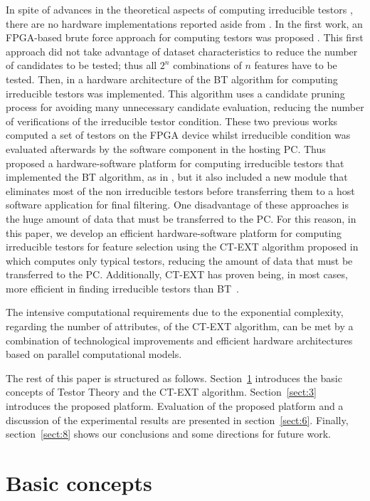 \documentclass[authoryear,preprint,review,12pt]{elsarticle}
\begin{document}
In spite of advances in the theoretical aspects of computing
irreducible testors \citep{R5,R8,R9}, there are 
no hardware implementations reported aside from \citep{R10,R11,R21}.
In the first work, an FPGA-based brute force approach for computing testors was proposed
\citep{R10}. This first approach did not take advantage of dataset characteristics to reduce the number 
of candidates to be tested; thus all $2^n$ combinations of $n$ features have to be tested. 
Then, in \citep{R11} a hardware architecture of the BT algorithm for computing irreducible testors was implemented. 
This algorithm uses a candidate pruning process for avoiding many unnecessary candidate evaluation, 
reducing the number of verifications of the irreducible testor condition. 
These two previous works computed a set of testors on the FPGA device whilst irreducible condition 
was evaluated afterwards by the software component in the hosting PC. 
Thus \cite{R21} proposed a hardware-software platform for computing irreducible testors that 
implemented the BT algorithm, as in \citep{R11}, but it also included a new module that eliminates most of 
the non irreducible testors before transferring them to a host software application for final filtering. 
One disadvantage of these approaches is the huge amount of data that must be transferred to the PC.  
For this reason, in this paper, we develop an efficient hardware-software platform for computing irreducible
testors for feature selection %
using the CT-EXT algorithm proposed in~\citep{R22} which computes only typical testors, 
reducing the amount of data that must be transferred to the PC. Additionally, CT-EXT has proven being, 
in most cases, more efficient in finding irreducible testors than BT~\citep{R22, R23}.

The intensive computational requirements due to the exponential
complexity, regarding the number of attributes, of the CT-EXT algorithm,
can be met by a combination of technological improvements and efficient hardware architectures based on 
parallel computational models. 

The rest of this paper is structured as follows. Section~\ref{sect:2} introduces the basic concepts of 
Testor Theory and the CT-EXT algorithm. Section~\ref{sect:3} introduces the proposed platform.  
Evaluation of the proposed platform and a discussion of the experimental results are 
presented in section~\ref{sect:6}. Finally, section~\ref{sect:8} shows our conclusions and some directions 
for future work.

\section{Basic concepts}
\label{sect:2}
\end{document}

